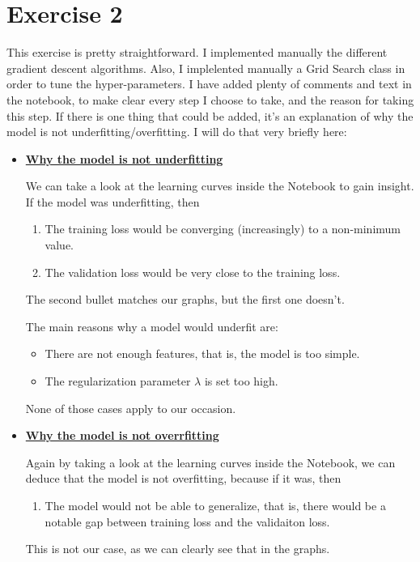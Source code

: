 \documentclass[12pt]{report}
\begin{document}
\section*{Exercise 2}
This exercise is pretty straightforward. I implemented manually the different gradient descent
algorithms. Also, I implelented manually a Grid Search class in order to tune the hyper-parameters.
I have added plenty of comments and text in the notebook, to make clear every step I choose to take,
and the reason for taking this step. If there is one thing that could be added, it's an explanation
of why the model is not underfitting/overfitting. I will do that very briefly here:

\begin{itemize}
    \item \underline{\textbf{Why the model is not underfitting}}
        \bigskip

        We can take a look at the learning curves inside the Notebook to gain insight.
        If the model was underfitting, then 
        
        \begin{enumerate}
            \item The training loss would be converging (increasingly) to a non-minimum value.
            \item The validation loss would be very close to the training loss.
        \end{enumerate}
        The second bullet matches our graphs, but the first one doesn't.
        \bigskip

        The main reasons why a model would underfit are:
        \begin{itemize}
            \item There are not enough features, that is, the model is too simple.
            \item The regularization parameter $\lambda$ is set too high.
        \end{itemize}
        None of those cases apply to our occasion.
        \bigskip
        

    \item \underline{\textbf{Why the model is not overrfitting}}
        \bigskip

        Again by taking a look at the learning curves inside the Notebook, we can deduce that the model is
        not overfitting, because if it was, then

        \begin{enumerate}
            \item The model would not be able to generalize, that is, there would be a notable gap between
                training loss and the validaiton loss.
        \end{enumerate}
        This is not our case, as we can clearly see that in the graphs.
        \bigskip


\end{itemize}
\end{document}
